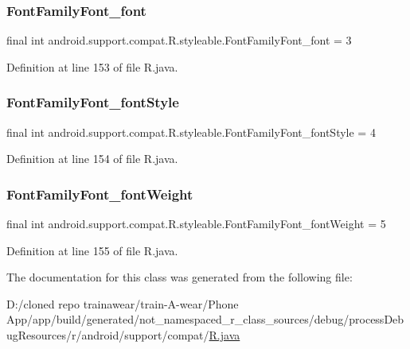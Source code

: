 \subsubsection{\texorpdfstring{FontFamilyFont\_font}{FontFamilyFont\_font}}
{\footnotesize\ttfamily final int android.\+support.\+compat.\+R.\+styleable.\+Font\+Family\+Font\+\_\+font = 3\hspace{0.3cm}{\ttfamily [static]}}



Definition at line 153 of file R.\+java.

\mbox{\label{classandroid_1_1support_1_1compat_1_1_r_1_1styleable_aad9bcc3dabdebc9e742a2c88c419bcd0}} 
\subsubsection{\texorpdfstring{FontFamilyFont\_fontStyle}{FontFamilyFont\_fontStyle}}
{\footnotesize\ttfamily final int android.\+support.\+compat.\+R.\+styleable.\+Font\+Family\+Font\+\_\+font\+Style = 4\hspace{0.3cm}{\ttfamily [static]}}



Definition at line 154 of file R.\+java.

\mbox{\label{classandroid_1_1support_1_1compat_1_1_r_1_1styleable_abe914cf7b1d07e59e4c8216fac03d2f8}} 
\subsubsection{\texorpdfstring{FontFamilyFont\_fontWeight}{FontFamilyFont\_fontWeight}}
{\footnotesize\ttfamily final int android.\+support.\+compat.\+R.\+styleable.\+Font\+Family\+Font\+\_\+font\+Weight = 5\hspace{0.3cm}{\ttfamily [static]}}



Definition at line 155 of file R.\+java.



The documentation for this class was generated from the following file\+:\begin{DoxyCompactItemize}
\item 
D\+:/cloned repo trainawear/train-\/\+A-\/wear/\+Phone App/app/build/generated/not\+\_\+namespaced\+\_\+r\+\_\+class\+\_\+sources/debug/process\+Debug\+Resources/r/android/support/compat/\mbox{\hyperlink{process_debug_resources_2r_2android_2support_2compat_2_r_8java}{R.\+java}}\end{DoxyCompactItemize}
